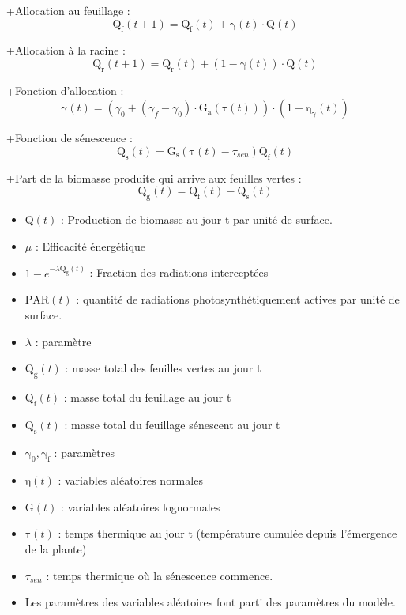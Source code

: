 +Allocation au feuillage :
 \[ \mathrm{Q_f}(t+1) = \mathrm{Q_f}(t) + \mathrm{\gamma}(t)\cdot\mathrm{Q}(t) \]
 
+Allocation à la racine :
 \[ \mathrm{Q_r}(t+1) = \mathrm{Q_r}(t) + (1 -\mathrm{\gamma}(t))\cdot\mathrm{Q}(t) \]
 
+Fonction d'allocation :
 \[ \mathrm{\gamma}(t) = (\gamma_0 + (\gamma_f - \gamma_0)\cdot\mathrm{G_a}(\mathrm{\tau}(t)))\cdot(1+\mathrm{\eta_{\gamma}}(t)) \]
 
+Fonction de sénescence :
 \[ \mathrm{Q_s}(t) = \mathrm{G_s}(\mathrm{\tau}(t)- \tau_{sen})\mathrm{Q_f}(t) \]
 
+Part de la biomasse produite qui arrive aux feuilles vertes :
 \[\mathrm{Q_g}(t) = \mathrm{Q_f}(t) - \mathrm{Q_s}(t) \]
 
 \begin{itemize}
 
 \item $\mathrm{Q}(t)$ : Production de biomasse au jour t par unité de surface.
 \item $\mu$ : Efficacité énergétique
 \item $1-e^{-\lambda\mathrm{Q_g}(t)}$ : Fraction des radiations interceptées
 \item $\mathrm{PAR}(t)$ : quantité de radiations photosynthétiquement actives par unité de surface.
 \item $\lambda$ : paramètre
 \item $\mathrm{Q_g}(t)$ : masse total des feuilles vertes au jour t
 \item $\mathrm{Q_f}(t)$ : masse total du feuillage au jour t
 \item $\mathrm{Q_s}(t)$ : masse total du feuillage sénescent au jour t 
 \item $\mathrm{\gamma_0}, \mathrm{\gamma_f}$ : paramètres
 \item $\mathrm{\eta}(t)$ : variables aléatoires normales 
 \item $\mathrm{G}(t)$ : variables aléatoires lognormales
 \item $\mathrm{\tau}(t)$ : temps thermique au jour t (température cumulée depuis l'émergence de la plante)
 \item $\tau_{sen}$ : temps thermique où la sénescence commence.
 \item Les paramètres des variables aléatoires font parti des paramètres du modèle.
 
 \end{itemize}